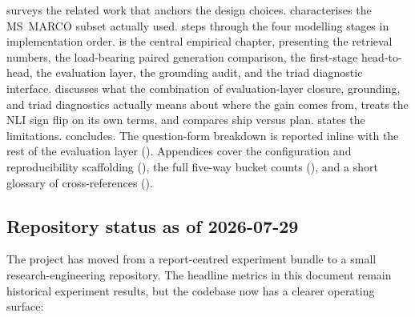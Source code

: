 \documentclass[11pt,a4paper]{article}
\newcommand{\msmarco}{MS~MARCO}
\begin{document}
 surveys the related work that anchors the design
choices.   characterises the \msmarco{} subset
actually used.   steps through the four modelling
stages in implementation order.   is the
central empirical chapter, presenting the retrieval numbers,
the load-bearing paired generation comparison, the
first-stage head-to-head, the evaluation layer, the
grounding audit, and the triad diagnostic interface.
 discusses what the combination of evaluation-layer closure,
grounding, and triad diagnostics actually means about
where the gain comes from, treats the NLI sign flip on its own
terms, and compares ship versus plan.   states
the limitations.   concludes.
The question-form breakdown is reported inline with the rest of the evaluation layer
().  Appendices cover the configuration and
reproducibility scaffolding (), the full
five-way bucket counts (), and a
short glossary of cross-references ().

\subsection{Repository status as of 2026-07-29}

The project has moved from a report-centred experiment bundle to a
small research-engineering repository.  The headline metrics in this
document remain historical experiment results, but the codebase now
has a clearer operating surface:
\end{document}
